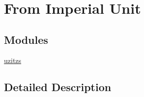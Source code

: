 \hypertarget{group___e_g_x_math-_conversions-_length_conversions-_imperial}{}\section{From Imperial Unit}
\label{group___e_g_x_math-_conversions-_length_conversions-_imperial}
\subsection*{Modules}
\begin{DoxyCompactItemize}
\item 
\mbox{\hyperlink{group___e_g_x_math-_conversions-_length_conversions-_imperial-uzitzs}{uzitzs}}
\end{DoxyCompactItemize}


\subsection{Detailed Description}
